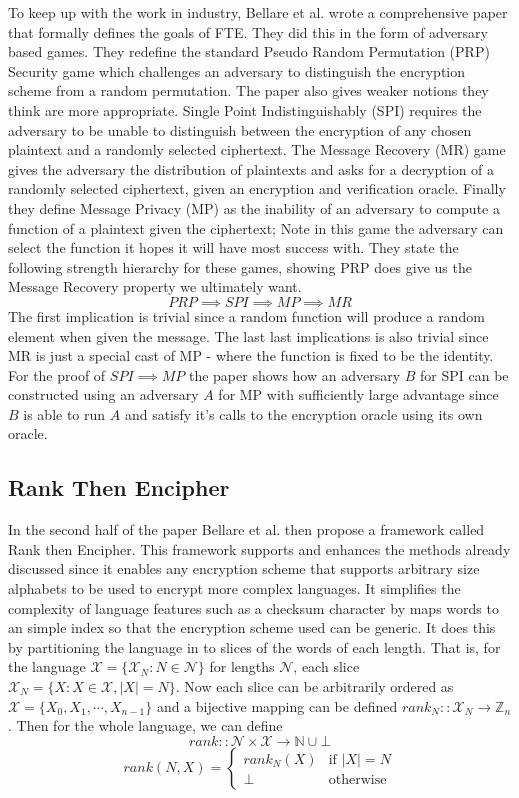 \documentclass[12pt,a4paper]{article}
\begin{document}
To keep up with the work in industry, Bellare et al. wrote a comprehensive paper\cite{fpe} that formally defines the goals of FTE. They did this in the form of adversary based games. They redefine the standard Pseudo Random Permutation (PRP) Security game which challenges an adversary to distinguish the encryption scheme from a random permutation. The paper also gives weaker notions they think are more appropriate. Single Point Indistinguishably (SPI) requires the adversary to be unable to distinguish between the encryption of any chosen plaintext and a randomly selected ciphertext. The Message Recovery (MR) game gives the adversary the distribution of plaintexts and asks for a decryption of a randomly selected ciphertext, given an encryption and verification oracle. Finally they define Message Privacy (MP) as the inability of an adversary to compute a function of a plaintext given the ciphertext; Note in this game the adversary can select the function it hopes it will have most success with. They state the following strength hierarchy for these games, showing PRP does give us the Message Recovery property we ultimately want.
$$ PRP \implies SPI \implies MP \implies MR $$
The first implication is trivial since a random function will produce a random element when given the message. The last last implications is also trivial since MR is just a special cast of MP - where the function is fixed to be the identity. For the proof of $ SPI \implies MP $ the paper shows how an adversary $B$ for SPI can be  constructed using an adversary $A$ for MP with sufficiently large advantage since $B$ is able to run $A$ and satisfy it's calls to the encryption oracle using its own oracle.
\subsection{Rank Then Encipher}
In the second half of the paper\cite{fpe} Bellare et al. then propose a framework called Rank then Encipher. This framework supports and enhances the methods already discussed since it enables any encryption scheme that supports arbitrary size alphabets to be used to encrypt more complex languages. It simplifies the complexity of language features such as a checksum character by maps words to an simple index so that the encryption scheme used can be generic. It does this by partitioning the language in to slices of the words of each length. That is, for the language $\mathcal{X} = \{\mathcal{X}_N : N \in \mathcal{N} \}$ for lengths $\mathcal{N}$, each slice $\mathcal{X}_N = \{ X : X \in \mathcal{X}, \vert X \vert = N  \}$. Now each slice can be arbitrarily ordered as $\mathcal{X} = \{ X_0, X_1, \cdots , X_{n-1} \} $ and a bijective mapping can be defined $rank_N :: \mathcal{X}_N \rightarrow \mathbb{Z}_n$.
Then for the whole language, we can define
$$ rank :: \mathcal{N} \times \mathcal{X} \rightarrow \mathbb{N} \cup \bot $$
$$ rank(N,X) =
\left\{
	\begin{array}{ll}
		rank_N(X)  & \mbox{if } \vert X \vert = N\\
		\bot & \mbox{otherwise} 
	\end{array}
\right.
$$
\end{document}
